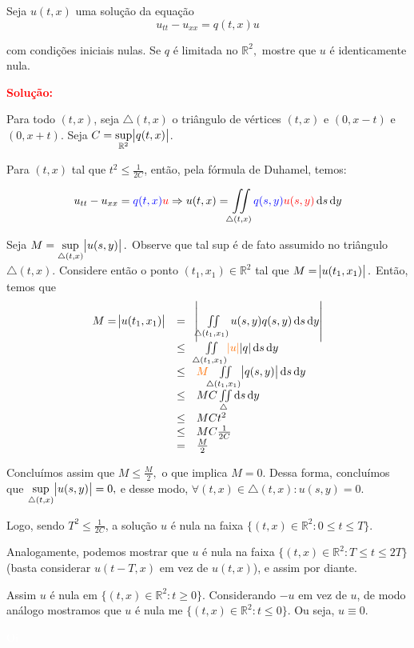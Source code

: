 \documentclass[11pt,a4paper]{article}
\newcommand{\solucao}[1]{\begin{mdframed}[style=MyFrame]
\textbf{\textcolor{red}{Solução:}} #1
\end{mdframed}\textcolor{white}{Oi} \newline}
\begin{document}
Seja $u(t, x)$ uma solução da equação
\[u_{tt} - u_{xx} = q(t, x)u\]

com condições iniciais nulas. Se $q$ é limitada no $\mathbb{R}^2,$ mostre que $u$ é identicamente nula.

\solucao{

Para todo $(t,x)$, seja $\triangle(t,x)$ o triângulo de vértices $(t,x)$ e $(0,x-t)$ e $(0,x+t)$. Seja $C=\sup\limits_{\mathbb{R}^2}\abs{q(t,x)}$.

\medskip
\noindent
Para $(t,x)$ tal que $t^2\leq\frac{1}{2C}$, então, pela fórmula de Duhamel, temos:

\[u_{tt} - u_{xx} = \textcolor{blue}{q(t, x)} \textcolor{red}{u} \Rightarrow u(t,x) = \iint\limits_{\triangle (t,x)} \textcolor{blue}{q(s,y)} \textcolor{red}{u(s,y)} \dif s \dif y
\]

Seja $M = \sup\limits_{\triangle (t,x)} \abs{u(s,y)}.$ 
Observe que tal sup é de fato assumido no triângulo $\triangle(t,x)$. Considere então o ponto $(t_1, x_1) \in \mathbb{R}^2$ tal que $M = \abs{u(t_1,x_1)}.$ 
Então, temos que
\[
\begin{array}{lcl}
M = \abs{u(t_1, x_1)} &=& \abs{\iint\limits_{\triangle(t_1,x_1)} u(s,y) q(s,y) \dif s \dif y } \\
& \le & \iint\limits_{\triangle(t_1,x_1)} \textcolor{Laranja}{\abs{u}} \abs{q} \dif s \dif y \\
& \le & \textcolor{Laranja}{M} \iint\limits_{\triangle(t_1,x_1)}  \abs{q(s,y)} \dif s \dif y \\
& \le & MC \iint\limits_{\triangle } \dif s \dif y \\
& \le & MCt^2 \\
& \le & MC\frac{1}{2C} \\
& = & \frac{M}{2}
\end{array}
\]

Concluímos assim que $M \leq \frac{M}{2},$ o que implica $M = 0.$ Dessa forma, concluímos que $\sup\limits_{\triangle (t,x)} \abs{u(s,y)} = 0,$ e desse modo, $\forall (t,x) \in \triangle(t,x):u(s,y) = 0.$

\medskip
\noindent
Logo, sendo $T^2\leq\frac{1}{2C}$, a solução $u$ é nula na faixa $\{(t,x)\in\mathbb{R}^2:0\leq t\leq T\}$.

\medskip
\noindent
Analogamente, podemos mostrar que $u$ é nula na faixa $\{(t,x)\in\mathbb{R}^2:T\leq t\leq 2T\}$ (basta considerar $u(t-T,x)$ em vez de $u(t,x)$), e assim por diante.

\medskip
\noindent
Assim $u$ é nula em $\{(t,x)\in\mathbb{R}^2:t\geq 0\}$. Considerando $-u$ em vez de $u$, de modo análogo mostramos que $u$ é nula me $\{(t,x)\in\mathbb{R}^2:t\leq 0\}$. Ou seja, $u\equiv 0$.

}
\end{document}
